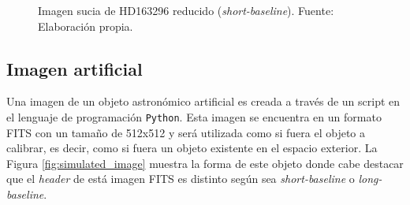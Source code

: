 \begin{figure}[!ht]
 \centering
 \caption[Imagen sucia de HD163296 reducido (\textit{short-baseline})]{Imagen sucia de HD163296 reducido (\textit{short-baseline}). Fuente: Elaboración propia.}
 \label{fig:hd163296_obs3}
\end{figure}


\subsection{Imagen artificial}
\label{subsec:artificial_image}

Una imagen de un objeto astronómico artificial es creada a través de un script en el lenguaje de programación \texttt{Python}. Esta imagen se encuentra en un formato FITS con un tamaño de 512x512 y será utilizada como si fuera el objeto a calibrar, es decir, como si fuera un objeto existente en el espacio exterior. La Figura \ref{fig:simulated_image} muestra la forma de este objeto donde cabe destacar que el \textit{header} de está imagen FITS es distinto según sea \textit{short-baseline} o \textit{long-baseline}. 

